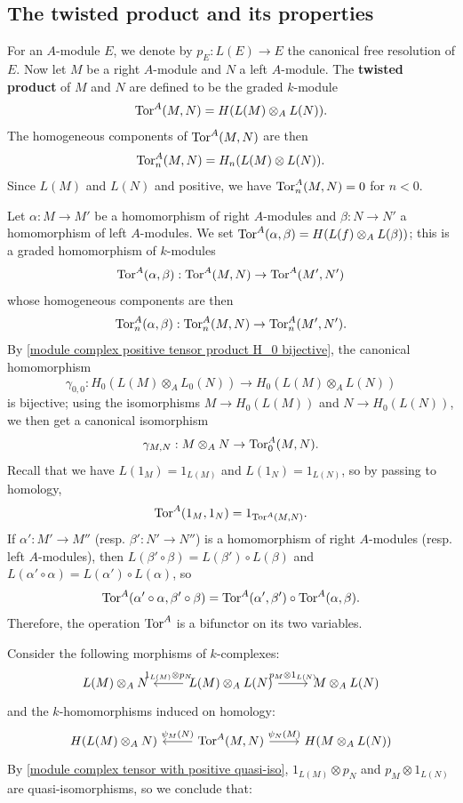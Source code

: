 \subsection{The twisted product and its properties}
For an $A$-module $E$, we denote by $p_E:L(E)\to E$ the canonical free resolution of $E$. Now let $M$ be a right $A$-module and $N$ a left $A$-module. The \textbf{twisted product} of $M$ and $N$ are defined to be the graded $k$-module
\[\mathrm{Tor}^A(M,N)=H(L(M)\otimes_AL(N)).\]
The homogeneous components of $\mathrm{Tor}^A(M,N)$ are then
\[\mathrm{Tor}_n^A(M,N)=H_n(L(M)\otimes L(N)).\]
Since $L(M)$ and $L(N)$ and positive, we have $\mathrm{Tor}_n^A(M,N)=0$ for $n<0$. \par
Let $\alpha:M\to M'$ be a homomorphism of right $A$-modules and $\beta:N\to N'$ a homomorphism of left $A$-modules. We set $\mathrm{Tor}^A(\alpha,\beta)=H(L(f)\otimes_AL(\beta))$; this is a graded homomorphism of $k$-modules
\[\mathrm{Tor}^A(\alpha,\beta):\mathrm{Tor}^A(M,N)\to\mathrm{Tor}^A(M',N')\]
whose homogeneous components are then
\[\mathrm{Tor}_n^A(\alpha,\beta):\mathrm{Tor}^A_n(M,N)\to\mathrm{Tor}_n^A(M',N').\]
By \cref{module complex positive tensor product H_0 bijective}, the canonical homomorphism
\[\gamma_{0,0}:H_0(L(M)\otimes_AL_0(N))\to H_0(L(M)\otimes_AL(N))\]
is bijective; using the isomorphisms $M\to H_0(L(M))$ and $N\to H_0(L(N))$, we then get a canonical isomorphism
\[\gamma_{M,N}:M\otimes_AN\to\mathrm{Tor}_0^A(M,N).\]
Recall that we have $L(1_M)=1_{L(M)}$ and $L(1_N)=1_{L(N)}$, so by passing to homology,
\[\mathrm{Tor}^A(1_M,1_N)=1_{\mathrm{Tor}^A(M,N)}.\]
If $\alpha':M'\to M''$ (resp. $\beta':N'\to N''$) is a homomorphism of right $A$-modules (resp. left $A$-modules), then $L(\beta'\circ\beta)=L(\beta')\circ L(\beta)$ and $L(\alpha'\circ\alpha)=L(\alpha')\circ L(\alpha)$, so
\[\mathrm{Tor}^A(\alpha'\circ\alpha,\beta'\circ\beta)=\mathrm{Tor}^A(\alpha',\beta')\circ\mathrm{Tor}^A(\alpha,\beta).\]
Therefore, the operation $\mathrm{Tor}^A$ is a bifunctor on its two variables.\par
Consider the following morphisms of $k$-complexes:
\[\begin{tikzcd}
L(M)\otimes_AN&L(M)\otimes_AL(N)\ar[l,swap,"1_{L(M)}\otimes p_N"]\ar[r,"p_M\otimes 1_{L(N)}"]&M\otimes_AL(N)
\end{tikzcd}\]
and the $k$-homomorphisms induced on homology:
\[\begin{tikzcd}
H(L(M)\otimes_AN)&\Tor^A(M,N)\ar[l,swap,"\psi_M(N)"]\ar[r,"\psi_N(M)"]&H(M\otimes_AL(N))
\end{tikzcd}\]
By \cref{module complex tensor with positive quasi-iso}, $1_{L(M)}\otimes p_N$ and $p_M\otimes 1_{L(N)}$ are quasi-isomorphisms, so we conclude that:
